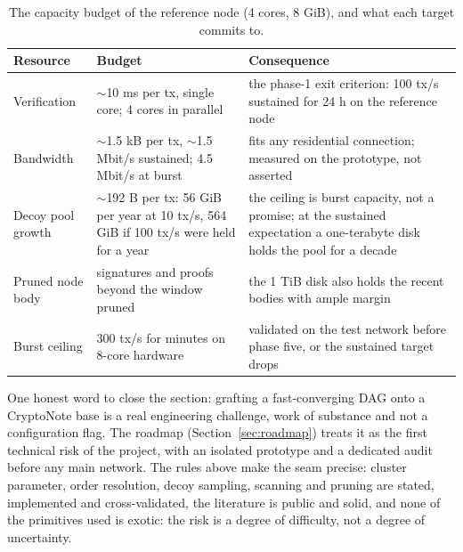 \begin{table}[htbp]
\centering
\small
\caption{The capacity budget of the reference node (4 cores, 8 GiB),
and what each target commits to.}
\label{tab:budget}
\begin{tabularx}{\textwidth}{@{}L{4.3cm}L{4.3cm}Y@{}}
\toprule
Resource & Budget & Consequence \\\midrule
Verification & $\sim$10 ms per tx, single core; 4 cores in parallel & the phase-1 exit criterion: 100 tx/s sustained for 24 h on the reference node \\
Bandwidth & $\sim$1.5 kB per tx, $\sim$1.5 Mbit/s sustained; 4.5 Mbit/s at burst & fits any residential connection; measured on the prototype, not asserted \\
Decoy pool growth & $\sim$192 B per tx: 56 GiB per year at 10 tx/s, 564 GiB if 100 tx/s were held for a year & the ceiling is burst capacity, not a promise; at the sustained expectation a one-terabyte disk holds the pool for a decade \\
Pruned node body & signatures and proofs beyond the window pruned & the 1 TiB disk also holds the recent bodies with ample margin \\
Burst ceiling & 300 tx/s for minutes on 8-core hardware & validated on the test network before phase five, or the sustained target drops \\
\bottomrule
\end{tabularx}
\end{table}

One honest word to close the section: grafting a fast-converging DAG onto
a CryptoNote base is a real engineering challenge, work of substance and
not a configuration flag. The roadmap (Section~\ref{sec:roadmap}) treats
it as the first technical risk of the project, with an isolated prototype
and a dedicated audit before any main network. The rules above make the
seam precise: cluster parameter, order resolution, decoy sampling,
scanning and pruning are stated, implemented and cross-validated, the
literature is public and solid, and none of the primitives
used is exotic: the risk is a degree of difficulty, not a degree of
uncertainty.
